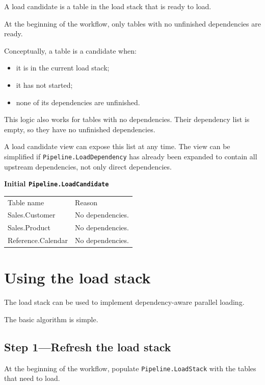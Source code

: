 \documentclass[10pt,openany,10pt]{book}
\providecommand{\tightlist}{%
  \setlength{\itemsep}{0pt}\setlength{\parskip}{0pt}}
\newcounter{none}
\let\podeToprule\toprule
\let\podeMidrule\midrule
\let\podeBottomrule\bottomrule
\renewcommand{\toprule}{\arrayrulecolor{pbiGrid}\podeToprule}
\renewcommand{\midrule}{\arrayrulecolor{pbiGrid}\podeMidrule}
\renewcommand{\bottomrule}{\arrayrulecolor{pbiGrid}\podeBottomrule}
\begin{document}
A load candidate is a table in the load stack that is ready to load.

At the beginning of the workflow, only tables with no unfinished
dependencies are ready.

Conceptually, a table is a candidate when:

\begin{itemize}
\tightlist
\item
  it is in the current load stack;
\item
  it has not started;
\item
  none of its dependencies are unfinished.
\end{itemize}

This logic also works for tables with no dependencies. Their dependency
list is empty, so they have no unfinished dependencies.

A load candidate view can expose this list at any time. The view can be
simplified if \texttt{Pipeline.LoadDependency} has already been expanded
to contain all upstream dependencies, not only direct dependencies.

\textbf{Initial \texttt{Pipeline.LoadCandidate}}

{\def\LTcaptype{none} %
\begin{longtable}[]{@{}ll@{}}
\toprule\noalign{}
Table name & Reason \\
\midrule\noalign{}
\endhead
\bottomrule\noalign{}
\endlastfoot
Sales.Customer & No dependencies. \\
Sales.Product & No dependencies. \\
Reference.Calendar & No dependencies. \\
\end{longtable}
}

\section{Using the load stack}\label{using-the-load-stack}

The load stack can be used to implement dependency-aware parallel
loading.

The basic algorithm is simple.

\subsection{Step 1---Refresh the load
stack}\label{step-1refresh-the-load-stack}

At the beginning of the workflow, populate \texttt{Pipeline.LoadStack}
with the tables that need to load.
\end{document}
